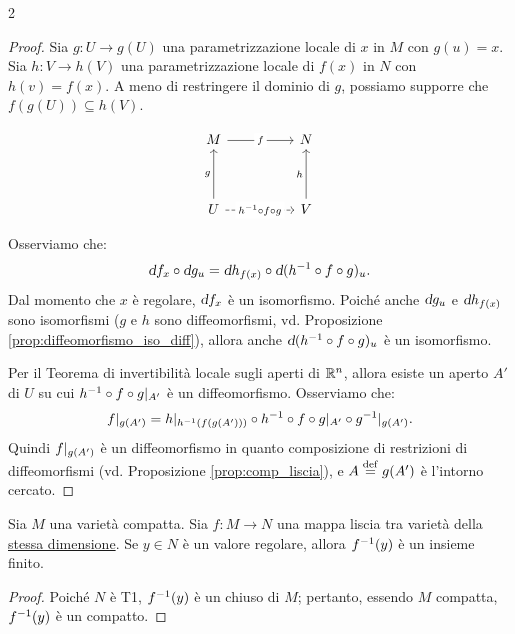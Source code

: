 \begin{multicols*}{2}
    \begin{proof}
        Sia $g : U \to g(U)$ una parametrizzazione locale di $x$ in $M$
        con $g(u) = x$.
        Sia $h : V \to h(V)$ una parametrizzazione locale di $f(x)$ in $N$
        con $h(v) = f(x)$.
        A meno di restringere il dominio di $g$, possiamo supporre che
        $f(g(U)) \subseteq h(V)$.

        \[\begin{tikzcd}
                M && N \\
                \\
                U && V
                \arrow["f"{description}, from=1-1, to=1-3]
                \arrow["g", from=3-1, to=1-1]
                \arrow["{h\inv \circ f \circ g}"{description}, dashed, from=3-1, to=3-3]
                \arrow["h", from=3-3, to=1-3]
            \end{tikzcd}\]

        Osserviamo che:
        \[ \dif f_x \circ \dif g_u = \dif h_{f(x)} \circ \dif (h\inv \circ f \circ g)_u. \]
        Dal momento che $x$ è regolare, $\dif f_x$ è un isomorfismo. Poiché anche $\dif g_u$
        e $\dif h_{f(x)}$ sono isomorfismi ($g$ e $h$ sono diffeomorfismi, vd. Proposizione
        \ref{prop:diffeomorfismo_iso_diff}), allora anche $\dif (h\inv \circ f \circ g)_u$ è
        un isomorfismo. \smallskip

        Per il Teorema di invertibilità locale sugli aperti di $\mathbb{R}^n$, allora esiste un
        aperto $A'$ di $U$ su cui $h^{-1} \circ f \circ g\arrowvert_{A'}$ è un diffeomorfismo.
        Osserviamo che:
        \[
            f\arrowvert_{g(A')} = h\arrowvert_{h^{-1}(f(g(A')))} \circ h^{-1} \circ f \circ g\arrowvert_{A'} \circ g^{-1}\arrowvert_{g(A')}.
        \]
        Quindi $f\arrowvert_{g(A')}$ è un diffeomorfismo in quanto composizione di restrizioni di
        diffeomorfismi (vd. Proposizione \ref{prop:comp_liscia}), e $A \overset{\mathrm{def}}{=} g(A')$ è l'intorno cercato.
    \end{proof}

    \begin{proposition} \label{prop:controimmagine_regolare_finita}
        Sia $M$ una varietà compatta. Sia $f : M \to N$ una mappa liscia tra varietà della
        \underline{stessa dimensione}. Se $y \in N$ è un valore regolare, allora $f^{-1}(y)$ è un insieme finito.
    \end{proposition}

    \begin{proof}
        Poiché $N$ è T1, $f^{-1}(y)$ è un chiuso di $M$; pertanto, essendo $M$ compatta, $f^{-1}(y)$ è
        un compatto. \smallskip


\end{proof}
\end{multicols*}
